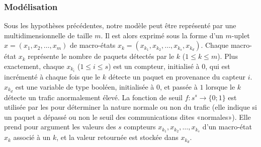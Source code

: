         \subsubsection{Modélisation}
Sous les hypothèses précédentes, notre modèle peut être représenté par une \cmtc multidimensionnelle de taille $m$.
Il est alors exprimé sous la forme d'un $m$-uplet $x\!=\!(x_1,x_2,\dots,x_m)$ de macro-états $x_k\!=\!(x_{k_1},x_{k_2},\dots,x_{k_s},x_{k_d})$.
Chaque macro-état $x_k$ représente le nombre de paquets détectés par le \cn $k$ ($1\leq k\leq m$).
Plus exactement, chaque $x_{k_i}$ ($1\leq i\leq s$) est un compteur, initialisé à $0$, qui est incrémenté à chaque fois que le \cn $k$ détecte un paquet en provenance du capteur $i$.
$x_{k_d}$ est une variable de type booléen, initialisée à $0$, et passée à $1$ lorsque le \cn $k$ détecte un trafic anormalement élevé.
La fonction de seuil $f:s^s\rightarrow\{0;1\}$ est utilisée par les \cns pour déterminer la nature normale ou non du trafic (elle indique si un paquet a dépassé ou non le seuil des communications dites «normales»).
Elle prend pour argument les valeurs des $s$ compteurs $x_{k_1},x_{k_2},\dots,x_{k_s}$ d'un macro-état $x_k$ associé à un \cn $k$, et la valeur retournée est stockée dans $x_{k_d}$.


